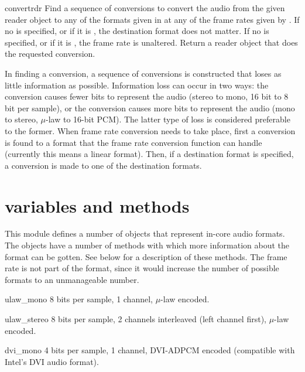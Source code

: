 \begin{funcdesc}{convert}{rdr}
Find a sequence of conversions to convert the audio from the given
reader object  to any of the formats given in 
at any of the frame rates given by .  If no 
is specified, or if it is , the destination format does not
matter.  If no  is specified, or if it is , the
frame rate is unaltered.  Return a reader object that does the
requested conversion.

In finding a conversion, a sequence of conversions is constructed that
loses as little information as possible.  Information loss can occur
in two ways: the conversion causes fewer bits to represent the audio
(stereo to mono, 16 bit to 8 bit per sample), or the conversion causes
more bits to represent the audio (mono to stereo, $\mu$-law to 16-bit
PCM).  The latter type of loss is considered preferable to the former.
When frame rate conversion needs to take place, first a conversion is
found to a format that the frame rate conversion function can handle
(currently this means a linear format).  Then, if a destination format
is specified, a conversion is made to one of the destination formats.
\end{funcdesc}

\section{ variables and methods}

This module defines a number of objects that represent in-core audio
formats.  The objects have a number of methods with which more
information about the format can be gotten.  See below for a
description of these methods.  The frame rate is not part of the
format, since it would increase the number of possible formats to an
unmanageable number.

\begin{datadesc}{ulaw_mono}
8 bits per sample, 1 channel, $\mu$-law encoded.
\end{datadesc}

\begin{datadesc}{ulaw_stereo}
8 bits per sample, 2 channels interleaved (left channel first),
$\mu$-law encoded.
\end{datadesc}

\begin{datadesc}{dvi_mono}
4 bits per sample, 1 channel, DVI-ADPCM encoded (compatible with
Intel's DVI audio format).
\end{datadesc}

